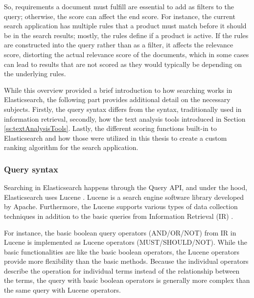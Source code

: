 So, requirements a document must fulfill are essential to add as filters to the query; 
otherwise, the score can affect the end score.
For instance, the current search application has multiple rules that a product must match before it 
should be in the search results; mostly, the rules define if a product is active.
If the rules are constructed into the query rather than as a filter, it affects the relevance score, 
distorting the actual relevance score of the documents, 
which in some cases can lead to results that are not scored as 
they would typically be depending on the underlying rules.


While this overview provided a brief introduction to how searching works in Elasticsearch,
the following part provides additional detail on the necessary subjects.
Firstly, the query syntax differs from the syntax, traditionally used in information retrieval, 
secondly, how the text analysis tools introduced in Section \ref{ss:textAnalysisTools}.
Lastly, the different scoring functions built-in to Elasticsearch and how those were
utilized in this thesis to create a custom ranking algorithm for the search application. 



\subsubsection{Query syntax}

Searching in Elasticsearch happens through the Query API, and under the hood, 
Elasticsearch uses Lucene \cite{elasticIntro}.
Lucene is a search engine software library developed by Apache.
Furthermore, the Lucene supports various types of data collection techniques in addition to 
the basic queries from Information Retrieval (IR) \cite{relevantSearch}.

For instance, the basic boolean query operators (AND/OR/NOT) from IR in Lucene is implemented as Lucene operators (MUST/SHOULD/NOT).
While the basic functionalities are like the basic boolean operators, 
the Lucene operators provide more flexibility than the basic methods.
Because the individual operators describe the operation for individual terms instead of the relationship between the terms,
the query with basic boolean operators is generally more complex than the same query with Lucene operators.
\cite{relevantSearch}

